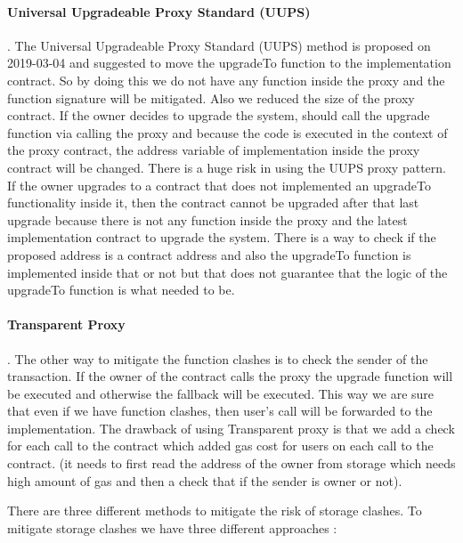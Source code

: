 \paragraph{Universal Upgradeable Proxy Standard (UUPS)}. 
The Universal Upgradeable Proxy Standard (UUPS) method is proposed on 2019-03-04 and suggested to move the upgradeTo function to the implementation contract. So by doing this we do not have any function inside the proxy and the function signature will be mitigated. Also we reduced the size of the proxy contract. If the owner decides to upgrade the system, should call the upgrade function via calling the proxy and because the code is executed in the context of the proxy contract, the address variable of implementation inside the proxy contract will be changed.
There is a huge risk in using the UUPS proxy pattern. If the owner upgrades to a contract that does not implemented an upgradeTo functionality inside it, then the contract cannot be upgraded after that last upgrade because there is not any function inside the proxy and the latest implementation contract to upgrade the system. There is a way to check if the proposed address is a contract address and also the upgradeTo function is implemented inside that or not but that does not guarantee that the logic of the upgradeTo function is what needed to be.


\paragraph{Transparent Proxy}. 
The other way to mitigate the function clashes is to check the sender of the transaction. If the owner of the contract calls the proxy the upgrade function will be executed and otherwise the fallback will be executed. This way we are sure that even if we have function clashes, then user's call will be forwarded to the implementation. 
The drawback of using Transparent proxy is that we add a check for each call to the contract which added gas cost for users on each call to the contract. (it needs to first read the address of the owner from storage which needs high amount of gas and then a check that if the sender is owner or not). 


There are three different methods to mitigate the risk of storage clashes.  To mitigate storage clashes we have three different approaches :

